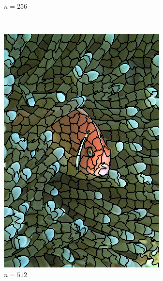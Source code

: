\documentclass[12pt]{article}
\begin{document}
\begin{figure}
\begin{subfigure}{0.48\textwidth}
    \caption{$n=256$}
  \end{subfigure} \\
  \begin{subfigure}{0.48\textwidth}
    \centering
    \includegraphics[width=.8\textwidth]{fish/fish_segmented_512.png}
    \caption{$n=512$}
  \end{subfigure}
  \begin{subfigure}{0.48\textwidth}
    \centering

\end{subfigure}
\end{figure}
\end{document}
